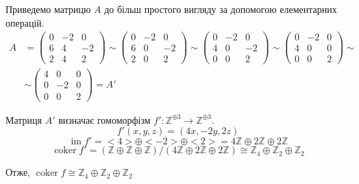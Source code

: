 \documentclass[11pt, a4paper]{article} %
\newcommand{\Z}{\mathbb{Z}}
\DeclareMathOperator{\coker}{coker}
\DeclareMathOperator{\im}{im}
\begin{document}
Приведемо матрицю $A$ до більш простого вигляду за допомогою елементарних операцій.
\begin{align*}
    A &= \begin{pmatrix}
        0 & -2 & 0 \\
        6 & 4 & -2 \\
        2 & 4 & 2
    \end{pmatrix} \sim
    \begin{pmatrix}
        0 & -2 & 0 \\
        6 & 0 & -2 \\
        2 & 0 & 2
    \end{pmatrix} \sim
    \begin{pmatrix}
        0 & -2 & 0 \\
        4 & 0 & -2 \\
        0 & 0 & 2
    \end{pmatrix} \sim
    \begin{pmatrix}
        0 & -2 & 0 \\
        4 & 0 & 0 \\
        0 & 0 & 2
    \end{pmatrix} \sim \\
    &\sim \begin{pmatrix}
        4 & 0 & 0 \\
        0 & -2 & 0 \\
        0 & 0 & 2
    \end{pmatrix} = A'
\end{align*}

Матриця $A'$ визначає гомоморфізм $f' : \Z^{\oplus 3}\to\Z^{\oplus 3}$.
\[f'(x,y,z) = (4x,-2y,2z)\]
\[\im f' = <4> \oplus <-2> \oplus <2> = 4\Z \oplus 2\Z \oplus 2\Z \]
\[\coker f' = (\Z\oplus\Z\oplus\Z)/(4\Z \oplus 2\Z \oplus 2\Z) \cong \Z_4\oplus\Z_2\oplus\Z_2\]

Отже, $\coker f \cong \Z_4\oplus\Z_2\oplus\Z_2$
\end{document}
